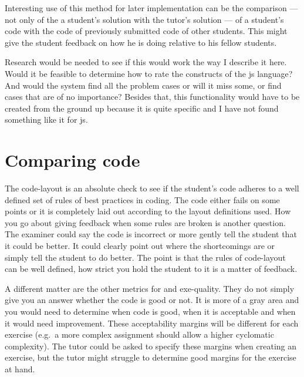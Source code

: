 Interesting use of this method for later implementation can be the comparison
--- not only of the a \gls{student}'s \gls{solution}
with the \gls{tutor}'s \gls{solution} ---
of a \gls{student}'s \gls{code} with the \gls{code}
of previously submitted \gls{code} of other \glspl{student}.
This might give the \gls{student} \gls{feedback} on how he is doing
relative to his fellow \glspl{student}.

Research would be needed to see if this would work
the way I describe it here.
Would it be feasible to determine how to rate the \glspl{construct}
of the \gls{js} language?
And would the system find all the problem cases or will it miss some,
or find cases that are of no importance?
Besides that, this functionality would have to be created from the ground up
because it is quite specific and I have not found something like it
for \gls{js}.

\section{Comparing code}

The \gls{code-layout} is an absolute check to see
if the \gls{student}'s \gls{code} adheres to a well defined set
of rules of best practices in coding.
The \gls{code} either fails on some points
or it is completely laid out according to the layout definitions used.
How you go about giving \gls{feedback} when some rules are broken
is another question.
The \gls{examiner} could say the \gls{code} is incorrect
or more gently tell the \gls{student} that it could be better.
It could clearly point out where the shortcomings are
or simply tell the \gls{student} to do better.
The point is that the rules of \gls{code-layout} can be well defined,
how strict you hold the \gls{student} to it is a matter of \gls{feedback}.

A different matter are the other metrics
for  and \gls{exe-quality}.
They do not simply give you an answer whether the \gls{code} is good or not.
It is more of a gray area and you would need to determine
when \gls{code} is good, when it is acceptable
and when it would need improvement.
These acceptability margins will be different for each \gls{exercise}
(e.g.\ a more complex assignment should allow a higher cyclomatic complexity).
The \gls{tutor} could be asked to specify these margins
when creating an \gls{exercise},
but the \gls{tutor} might struggle to determine good margins
for the \gls{exercise} at hand.

